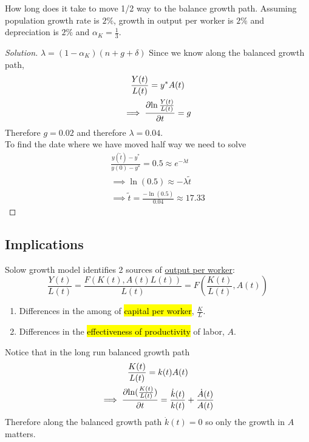 \documentclass[11pt]{article}
\begin{document}
	    \begin{example}
	        How long does it take to move 1/2 way to the balance growth path. Assuming population growth rate is $2\%$, growth in output per worker is $2\%$ and depreciation is $2\%$ and  $\alpha_K = \frac{1}{3}$.
	        \begin{proof}[Solution]
	            $\lambda = (1 - \alpha_K)(n + g + \delta)$ 
	            Since we know along the balanced growth path, \begin{gather}
	                \frac{Y(t)}{L(t)} = y^* A(t) \\
	                \implies \frac{\partial{\ln{\frac{Y(t)}{L(t)}}}}{\partial{t}} = g
	            \end{gather}
	            Therefore $g = 0.02$ and therefore $\lambda = 0.04$. \\
	            To find the date where we have moved half way we need to solve 
	            \begin{gather}
	                \frac{y(\tilde{t}) - y^*}{y(0) - y^*} = 0.5 \approx e^{-\lambda t}\\
	                \implies \ln(0.5) \approx -\lambda \tilde{t} \\
	                \implies \tilde{t} = \frac{-\ln(0.5)}{0.04} \approx 17.33
	            \end{gather}
	        \end{proof}
	    \end{example}
	    
	    \subsection{Implications}
	    \par Solow growth model identifies 2 sources of \ul{output per worker}:
	    \begin{equation}
		    	\frac{Y(t)}{L(t)} = \frac{F(K(t), A(t)L(t))}{L(t)} = F(\frac{K(t)}{L(t)}, A(t))
	    \end{equation}
	    \begin{enumerate}
	    	\item Differences in the among of \hl{capital per worker}, $\frac{K}{L}$.
	    	\item Differences in the \hl{effectiveness of productivity} of labor, $A$.
	    \end{enumerate}
	    Notice that in the long run balanced growth path
	    \begin{gather}
	    	\frac{K(t)}{L(t)} = k(t)A(t) \\
	    	\implies \frac{\partial{\ln(\frac{K(t)}{L(t)})}}{\partial{t}} = \frac{\dot{k}(t)}{k(t)} + \frac{\dot{A}(t)}{A(t)}
	    \end{gather}
	    Therefore along the balanced growth path $\dot{k}(t) = 0$ so only the growth in $A$ matters.
	    
\end{document}
